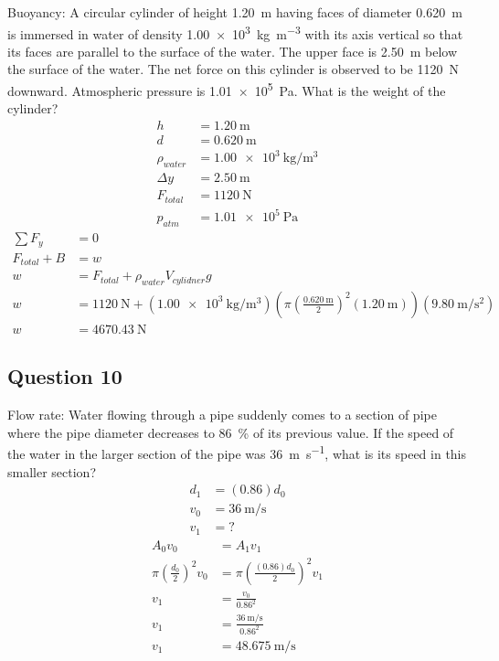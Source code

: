 \documentclass{article}
\begin{document}
Buoyancy: A circular cylinder of height \SI{1.20}{\meter} having faces of diameter \SI{0.620}{\meter} is immersed in water of density \SI{1.00e3}{\kilogram \per \meter \cubed} with its axis vertical so that its faces are parallel to the surface of the water. The upper face is \SI{2.50}{\meter} below the surface of the water. The net force on this cylinder is observed to be \SI{1120}{\newton} downward. Atmospheric pressure is \SI{1.01e5}{\pascal}. What is the weight of the cylinder?
\begin{align*}
	h & = \SI{1.20}{\meter} \\
	d & = \SI{0.620}{\meter} \\
	\rho_{water} & = \SI{1.00e3}{\kilogram \per \meter \cubed} \\
	\Delta y & = \SI{2.50}{\meter} \\
	F_{total} & = \SI{1120}{\newton} \\
	p_{atm} & = \SI{1.01e5}{\pascal}
\end{align*}
\begin{align*}
	\sum F_y & = 0 \\
	F_{total} + B & = w \\
	w & = F_{total} + \rho_{water}V_{cylidner}g \\
	w & = \SI{1120}{\newton} + (\SI{1.00e3}{\kilogram \per \meter \cubed}) \left( \pi \left( \frac{ \SI{0.620}{\meter} }{ 2 } \right)^2 (\SI{1.20}{\meter}) \right) (\SI{9.80}{\meter \per \second \squared}) \\
	w & = \SI{4670.43}{\newton}
\end{align*}

\subsection{Question 10}

Flow rate: Water flowing through a pipe suddenly comes to a section of pipe where the pipe diameter decreases to \SI{86}{\percent} of its previous value. If the speed of the water in the larger section of the pipe was \SI{36}{\meter \per \second}, what is its speed in this smaller section?
\begin{align*}
	d_1 & = (0.86)d_0 \\
	v_0 & = \SI{36}{\meter \per \second} \\
	v_1 & = ?
\end{align*}
\begin{align*}
	A_0v_0 & = A_1v_1 \\
	\pi \left( \frac{ d_0 }{ 2 } \right)^2v_0 & = \pi \left( \frac{ (0.86)d_0 }{ 2 } \right)^2v_1 \\
	v_1 & = \frac{ v_0 }{ 0.86^2 } \\
	v_1 & = \frac{ \SI{36}{\meter \per \second} }{ 0.86^2 } \\
	v_1 & = \SI{48.675}{\meter \per \second}
\end{align*}
\end{document}
